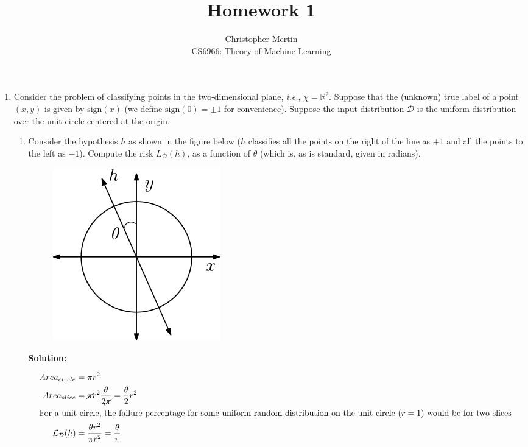 \documentclass[12pt]{article}
\newcommand{\sign}[1]{\text{sign}(#1)}
\begin{document}
 
 
\title{Homework 1}%
\author{Christopher Mertin\\ %
CS6966: Theory of Machine Learning} %
 
\maketitle

\begin{enumerate}
\item Consider the problem of classifying points in the two-dimensional plane, {\em i.e.}, $\chi = \mathbb{R}^{2}$. Suppose that the (unknown) true label of a point $(x,y)$ is given by $\sign{x}$ (we define $\sign{0} = \pm 1$ for convenience). Suppose the input distribution $\mathcal{D}$ is the uniform distribution over the unit circle centered at the origin.

\begin{enumerate}
\item Consider the hypothesis $h$ as shown in the figure below ($h$ classifies all the points on the right of the line as $+1$ and all the points to the left as $-1$). Compute the risk $L_{\mathcal{D}}(h)$, as a function of $\theta$ (which is, as is standard, given in radians). 

\begin{figure}[H]
\centering
\includegraphics[width=.25\textwidth]{hw1_fig1.png}
\end{figure}

{\bf Solution:}

\begin{align*}
Area_{circle} &= \pi r^{2}\\
Area_{slice} &= \cancel{\pi} r^{2} \frac{\theta}{2\cancel{\pi}} = \frac{\theta }{2}r^{2}\\
\intertext{For a unit circle, the failure percentage for some uniform random distribution on the unit circle $(r = 1)$ would be for two slices}
\mathcal{L}_{\mathcal{D}}(h) &= \frac{\theta r^{2}}{\pi r^{2}} = \frac{\theta}{\pi}
\end{align*}


\end{enumerate}
\end{enumerate}
\end{document}
